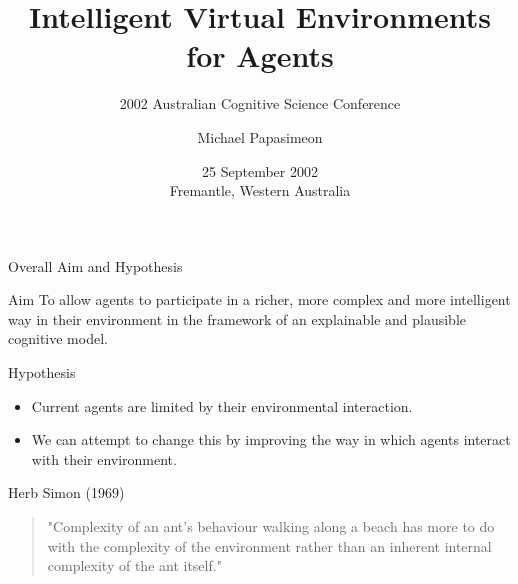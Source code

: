 \documentclass[aspectratio=1610,xcolor=dvipsnames,t]{beamer}
\title[Intelligent Virtual Environments]{Intelligent Virtual Environments for Agents}
\subtitle{2002 Australian Cognitive Science Conference}
\author[Michael Papasimeon]{Michael Papasimeon}
\date[OZCOGSCI 2002]{25 September 2002\\ Fremantle, Western Australia}
\begin{document}
\begin{frame}
    \maketitle
\end{frame} 

\begin{frame}{Overall Aim and Hypothesis} 
    \begin{block}{Aim}
        To allow agents to participate in a richer, more complex and more
        intelligent way in their environment in the framework of an explainable
        and plausible cognitive model. 
    \end{block}
    \begin{block}{Hypothesis}
        \begin{itemize}
            \item Current agents are limited by their environmental
                  interaction.
            \item We can attempt to change this by improving the way
                  in which agents interact with their environment.
        \end{itemize}
    \end{block} 
    \begin{exampleblock}{Herb Simon (1969)} 
        \begin{quote}
            "Complexity of an ant's behaviour walking along a beach
            has more to do with the complexity of the environment
            rather than an inherent internal complexity of the 
            ant itself."
        \end{quote}
    \end{exampleblock} 
\end{frame} 
\end{document}
